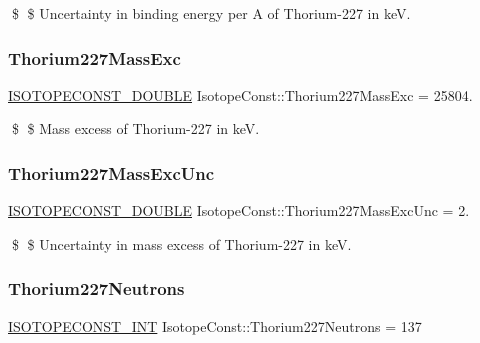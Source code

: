 \$ \$ Uncertainty in binding energy per A of Thorium-\/227 in keV. \mbox{\label{group___isotope_const-_thorium-_th227_ga68890a0163f7cb0819dc308816772d20}} 
\subsubsection{\texorpdfstring{Thorium227\+Mass\+Exc}{Thorium227MassExc}}
{\footnotesize\ttfamily \mbox{\hyperlink{group___isotope_const-_macros_ga8f45a7272ce02c0b4c65c44636ed719a}{I\+S\+O\+T\+O\+P\+E\+C\+O\+N\+S\+T\+\_\+\+D\+O\+U\+B\+LE}} Isotope\+Const\+::\+Thorium227\+Mass\+Exc = 25804.}

\$ \$ Mass excess of Thorium-\/227 in keV. \mbox{\label{group___isotope_const-_thorium-_th227_gae6104eb9f56eb6620b17868ed125ac12}} 
\subsubsection{\texorpdfstring{Thorium227\+Mass\+Exc\+Unc}{Thorium227MassExcUnc}}
{\footnotesize\ttfamily \mbox{\hyperlink{group___isotope_const-_macros_ga8f45a7272ce02c0b4c65c44636ed719a}{I\+S\+O\+T\+O\+P\+E\+C\+O\+N\+S\+T\+\_\+\+D\+O\+U\+B\+LE}} Isotope\+Const\+::\+Thorium227\+Mass\+Exc\+Unc = 2.}

\$ \$ Uncertainty in mass excess of Thorium-\/227 in keV. \mbox{\label{group___isotope_const-_thorium-_th227_gadf149e6ee215e4a9edcf1e8b884cb293}} 
\subsubsection{\texorpdfstring{Thorium227\+Neutrons}{Thorium227Neutrons}}
{\footnotesize\ttfamily \mbox{\hyperlink{group___isotope_const-_macros_ga5f18360b3e99483a35c32d789e62621c}{I\+S\+O\+T\+O\+P\+E\+C\+O\+N\+S\+T\+\_\+\+I\+NT}} Isotope\+Const\+::\+Thorium227\+Neutrons = 137}


